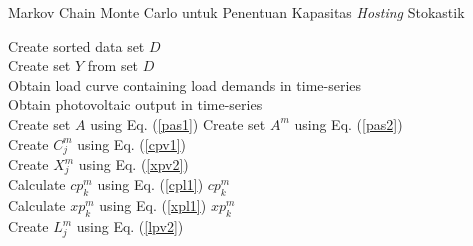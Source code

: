 \bgroup
\begin{algorithm}[htbp]
	\caption{Markov Chain Monte Carlo untuk Penentuan Kapasitas \textit{Hosting} Stokastik}\label{alg:marchai1}
	\begin{algorithmic}[1]
		\State Create sorted data set $\mathit{D}$
		\EndProcedure \\
		
		\State{}
		\State Create set $Y$ from set $D$
		\EndProcedure \\
		
		\State Obtain load curve containing load demands in time-series
		\EndProcedure \\
		
		\State Obtain photovoltaic output in time-series
		\EndProcedure \\	
		
		\State Create set $A$ using Eq. (\ref{pas1})
		\State Create set $A^m$ using Eq. (\ref{pas2})
		\EndProcedure \\
		
		\State Create $\mathit{C^m_j}$ using Eq. (\ref{cpv1})
		\EndProcedure\\
		
		\State Create $\mathit{X^m_j}$ using Eq. (\ref{xpv2})
		\EndProcedure\\

		\State Calculate $cp^m_k$ using Eq. (\ref{cpl1})
		\State\Return $cp^m_k$
		\EndFunction \\
		
		\State Calculate $xp^m_k$ using Eq. (\ref{xpl1})
		\State\Return $xp^m_k$
		\EndFunction \\
		
		\State  Create $\mathit{L^m_j}$ using Eq. (\ref{lpv2})
		\EndProcedure

	\end{algorithmic}
\end{algorithm}
